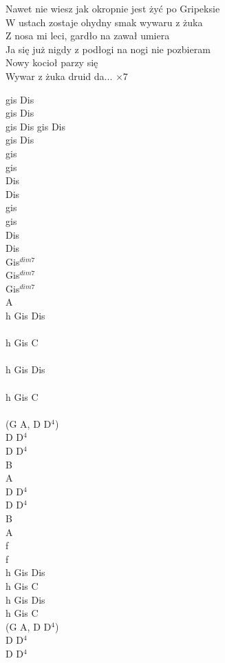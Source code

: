 \documentclass[a5paper, 10pt]{book}
\begin{document}
\begin{minipage}[t]{0.8\textwidth}
  \hspace*{6mm}Nawet nie wiesz jak okropnie jest żyć po Gripeksie       \\
  \hspace*{6mm}W ustach zostaje ohydny smak wywaru z żuka           \\
  \hspace*{6mm}Z nosa mi leci, gardło na zawał umiera                 \\
  \hspace*{6mm}Ja się już nigdy z podłogi na nogi nie pozbieram \\

  Nowy kocioł parzy się\\
  Wywar z żuka druid da... $\times 7$\\

\end{minipage}
\begin{minipage}[t]{0.2\textwidth}
  gis Dis\\
  gis Dis\\
  gis Dis
  gis Dis\\
  gis Dis\\
  gis\\gis\\Dis\\Dis\\
  gis\\gis\\Dis\\Dis\\
  Gis$^{dim7}$\\
  Gis$^{dim7}$\\
  Gis$^{dim7}$\\
  A\\

  h Gis Dis\\
  \\
  h Gis C\\
  \\
  h Gis Dis\\
  \\
  h Gis C\\
  \\
  (G A, D D$^4$)\\
  D D$^4$\\
  D D$^4$\\
  B\\
  A\\
  D D$^4$\\
  D D$^4$\\
  B\\
  A\\
  f\\
  f\\

  h Gis Dis\\
  h Gis C\\
  h Gis Dis\\
  h Gis C\\
  (G A, D D$^4$)\\
  D D$^4$\\
  D D$^4$\\

\end{minipage}
\end{document}
